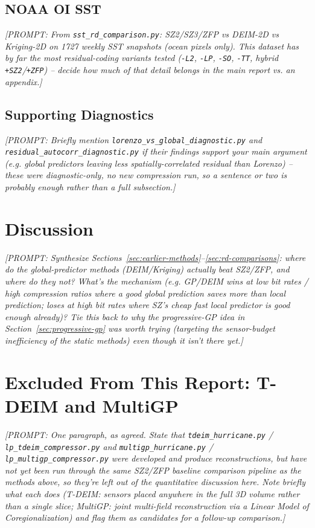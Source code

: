 \documentclass[11pt]{article}
\newcommand{\prompt}[1]{{\color{red}\itshape [PROMPT: #1]}\par\medskip}
\begin{document}
\subsection{NOAA OI SST}
\prompt{From \texttt{sst\_rd\_comparison.py}: SZ2/SZ3/ZFP vs DEIM-2D vs
Kriging-2D on 1727 weekly SST snapshots (ocean pixels only). This
dataset has by far the most residual-coding variants tested
(\texttt{-L2}, \texttt{-LP}, \texttt{-SO}, \texttt{-TT}, hybrid
\texttt{+SZ2}/\texttt{+ZFP}) -- decide how much of that detail belongs
in the main report vs. an appendix.}

\subsection{Supporting Diagnostics}
\prompt{Briefly mention \texttt{lorenzo\_vs\_global\_diagnostic.py} and
\texttt{residual\_autocorr\_diagnostic.py} if their findings support your
main argument (e.g. global predictors leaving less spatially-correlated
residual than Lorenzo) -- these were diagnostic-only, no new compression
run, so a sentence or two is probably enough rather than a full subsection.}

\section{Discussion}
\label{sec:discussion}

\prompt{Synthesize Sections~\ref{sec:earlier-methods}--\ref{sec:rd-comparisons}:
where do the global-predictor methods (DEIM/Kriging) actually beat
SZ2/ZFP, and where do they not? What's the mechanism (e.g. GP/DEIM wins
at low bit rates / high compression ratios where a good global
prediction saves more than local prediction; loses at high bit rates
where SZ's cheap fast local predictor is good enough already)? Tie this
back to why the progressive-GP idea in Section~\ref{sec:progressive-gp}
was worth trying (targeting the sensor-budget inefficiency of the
static methods) even though it isn't there yet.}

\section{Excluded From This Report: T-DEIM and MultiGP}
\label{sec:excluded}

\prompt{One paragraph, as agreed. State that \texttt{tdeim\_hurricane.py}
/ \texttt{lp\_tdeim\_compressor.py} and \texttt{multigp\_hurricane.py} /
\texttt{lp\_multigp\_compressor.py} were developed and produce
reconstructions, but have not yet been run through the same SZ2/ZFP
baseline comparison pipeline as the methods above, so they're left out
of the quantitative discussion here. Note briefly what each does
(T-DEIM: sensors placed anywhere in the full 3D volume rather than a
single slice; MultiGP: joint multi-field reconstruction via a Linear
Model of Coregionalization) and flag them as candidates for a follow-up
comparison.}
\end{document}
